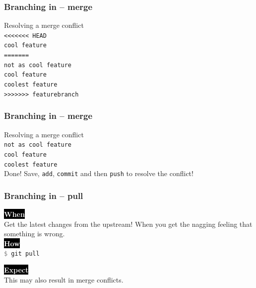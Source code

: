 \documentclass{beamer}
\newcommand{\keyword}[1]{\hspace{-1.0em}\colorbox{black}{\textcolor{white}{\textbf{#1}\vphantom{Ep}}}\vspace{0.2em}} %
\newcommand{\command}[1]{\texttt{\textcolor{gray}{\$} {#1}}}
\begin{document}
\begin{frame}
  \frametitle{Branching in -- merge} %

    Resolving a merge conflict \\[1em]

        \alert{\texttt{<<<<<<< HEAD}} \\
        \alert{\texttt{cool feature}} \\
        \alert{\texttt{=======}} \\
        \texttt{not as cool feature} \\
        \texttt{cool feature} \\
        \texttt{coolest feature} \\
        \alert{\texttt{>>>>>>> featurebranch}}
\end{frame}

\begin{frame}
  \frametitle{Branching in -- merge} %

    Resolving a merge conflict \\[1em]

        \texttt{not as cool feature} \\
        \texttt{cool feature} \\
        \texttt{coolest feature} \\[1em]
        Done! Save, \texttt{add}, \texttt{commit} and then \texttt{push} to
        resolve the conflict!
\end{frame}

\begin{frame}
  \frametitle{Branching in -- pull}
    \keyword{When}\\
    Get the latest changes from the upstream! When you get the nagging feeling
    that something is wrong. \\[1em]

    \keyword{How}\\
    \command{git pull} \\[3em]

    \pause

    \keyword{Expect}\\
    This may also result in \alert{merge conflicts}. \\[1em]
\end{frame}
\end{document}
